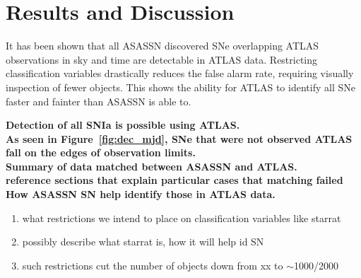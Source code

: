 \documentclass[aps,prb,twocolumn,superscriptaddress]{revtex4-1}
\begin{document}




\section{Results and Discussion}
\indent It has been shown that all ASASSN discovered SNe overlapping ATLAS 
observations in sky and time are detectable in ATLAS data. Restricting 
classification variables drastically reduces the false alarm rate, requiring 
visually inspection of fewer objects. This shows the ability for ATLAS to 
identify all SNe faster and fainter than ASASSN is able to.

{\bf Detection of all SNIa is possible using ATLAS.\\}
{\bf As seen in Figure~\ref{fig:dec_mjd}, SNe that were not 
observed ATLAS fall on the edges of observation limits.\\}
{\bf Summary of data matched between ASASSN and ATLAS.\\
reference sections that explain particular cases that matching failed}
{\bf How ASASSN SN help identify those in ATLAS data.}
\begin{enumerate}
	\item{} what restrictions we intend to place on classification variables like starrat
	\item{} possibly describe what starrat is, how it will help id SN
	\item{} such restrictions cut the number of objects down from xx to $\sim$1000/2000
\end{enumerate}
\end{document}
